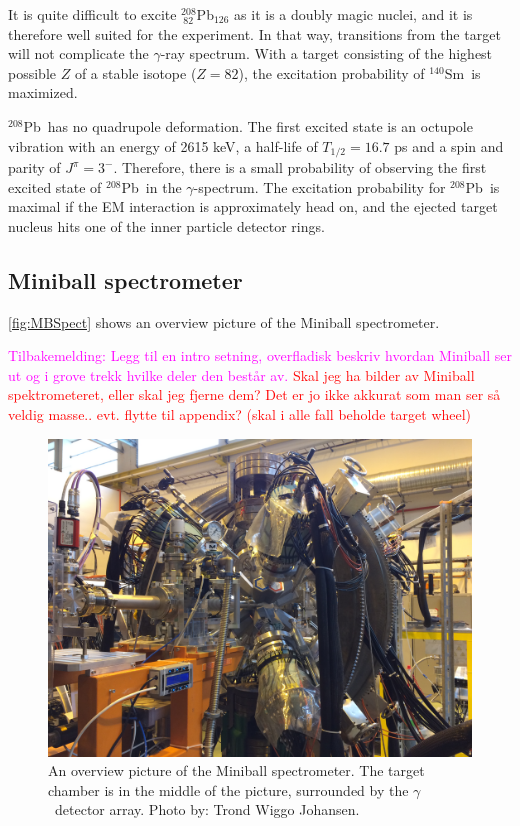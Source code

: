 \documentclass[twoside,english]{uiofysmaster/uiofysmaster}
\newcommand{\Sm}{$^{140}$Sm} %
\newcommand{\Pb}{$^{208}$Pb}
\newcommand{\ga}{$\gamma$}
\let\orgautoref\autoref
\renewcommand{\autoref}
        {%
		 \def\sectionautorefname{Section}%
		 \def\subsectionautorefname{Section}%
		 \def\subsubsectionautorefname{Section}%
		 \def\chapterautorefname{Chapter}%
          \orgautoref}
\begin{document}
It is quite difficult to excite $^{208}_{~82}$Pb$_{126}$ as it is a doubly magic nuclei, and it is therefore well suited for the experiment. 
In that way, transitions from the target will not complicate the \ga-ray spectrum.
With a target consisting of the highest possible $Z$ of a stable isotope ($Z = 82$), the excitation probability of \Sm\ is maximized. 

\Pb\ has no quadrupole deformation.
The first excited state is an octupole vibration with an energy of 2615 keV, a half-life of $T_{1/2} = 16.7$ ps and a spin and parity of $J^\pi = 3^-$.
Therefore, there is a small probability of observing the first excited state of \Pb\ in the \ga-spectrum. 
The excitation probability for \Pb\ is maximal if the EM interaction is approximately head on, and the ejected target nucleus hits one of the inner particle detector rings.


\subsection{Miniball spectrometer}
\autoref{fig:MBSpect} shows an overview picture of the Miniball spectrometer. 

\textcolor{Magenta}{Tilbakemelding:\newline
Legg til en intro setning, overfladisk beskriv hvordan Miniball ser ut og i grove trekk hvilke deler den består av.
}
\textcolor{red}{Skal jeg ha bilder av Miniball spektrometeret, eller skal jeg fjerne dem? Det er jo ikke akkurat som man ser så veldig masse.. evt. flytte til appendix? (skal i alle fall beholde target wheel)}

\begin{figure}[ht]
	\centering
	\includegraphics[width=\linewidth]{Images/IMG3849.JPG}
	\caption{An overview picture of the Miniball spectrometer. The target chamber is in the middle of the picture, surrounded by the \ga\ detector array. Photo by: Trond Wiggo Johansen.}
	\label{fig:MBSpect}
\end{figure}
\end{document}
